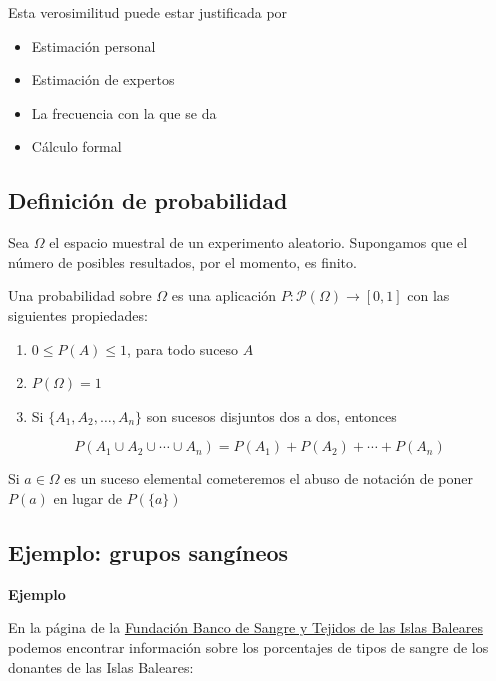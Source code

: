 \documentclass[]{book}
\providecommand{\tightlist}{%
  \setlength{\itemsep}{0pt}\setlength{\parskip}{0pt}}
\begin{document}
Esta verosimilitud puede estar justificada por

\begin{itemize}
\item
  Estimación personal
\item
  Estimación de expertos
\item
  La frecuencia con la que se da
\item
  Cálculo formal
\end{itemize}

\hypertarget{definiciuxf3n-de-probabilidad-1}{%
\subsection{Definición de probabilidad}\label{definiciuxf3n-de-probabilidad-1}}

Sea \(\Omega\) el espacio muestral de un experimento aleatorio.
Supongamos que el número de posibles resultados, por el momento, es finito.

Una probabilidad sobre \(\Omega\) es una aplicación \(P:\mathcal{P}(\Omega)\to [0,1]\) con las siguientes propiedades:

\begin{enumerate}
\def\labelenumi{\arabic{enumi}.}
\tightlist
\item
  \(0\leq P(A)\leq 1\), para todo suceso \(A\)
\item
  \(P(\Omega)=1\)
\item
  Si \(\{A_1,A_2,\ldots,A_n\}\) son sucesos disjuntos dos a dos, entonces
\end{enumerate}

\[
P(A_1\cup A_2\cup \cdots \cup A_n)=P(A_1)+P(A_2)+\cdots +P(A_n)
\]

Si \(a\in \Omega\) es un suceso elemental cometeremos el abuso de notación de poner \(P(a)\) en lugar de \(P(\{a\})\)

\hypertarget{ejemplo-grupos-sanguxedneos}{%
\subsection{Ejemplo: grupos sangíneos}\label{ejemplo-grupos-sanguxedneos}}

\textbf{Ejemplo}

En la página de la \href{http://www.donasang.org/que-es-la-sang/es_frequencies-dels-diferents-grups.html}{Fundación Banco de Sangre y Tejidos de las Islas Baleares} podemos encontrar información sobre los porcentajes de tipos de sangre de los donantes de las Islas Baleares:
\end{document}
